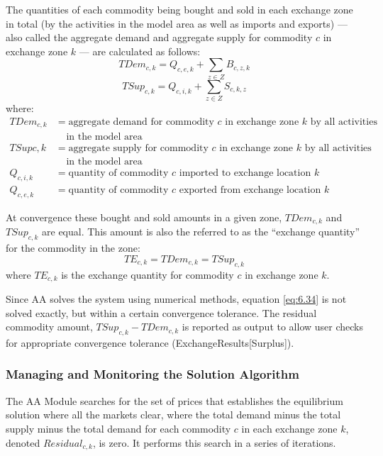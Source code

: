 The quantities of each commodity being bought and sold in each exchange zone in total (by the activities in the model area as well as imports and exports) --- also called the aggregate demand and aggregate supply for commodity $c$ in exchange zone $k$ --- are calculated as follows:
\begin{equation}\label{eq:6.32}
TDem_{c,k} = Q_{c,e,k} + \sum_{z \in Z} B_{c,z,k}
\end{equation}
\begin{equation}\label{eq:6.33}
TSup_{c,k} = Q_{c,i,k} + \sum_{z \in Z} S_{c,k,z}
\end{equation}
\noindent where:
\begin{align*}
TDem_{c,k} &= \text{aggregate demand for commodity $c$ in exchange zone $k$ by all activities} \\
 &~~~~~\text{in the model area} \\ 
TSup c,k &= \text{aggregate supply for commodity $c$ in exchange zone $k$ by all activities} \\ 
 &~~~~~\text{in the model area} \\ 
Q_{c,i,k} &= \text{quantity of commodity $c$ imported to exchange location $k$} \\
Q_{c,e,k} &= \text{quantity of commodity $c$ exported from exchange location $k$} 
\end{align*}

At convergence these bought and sold amounts in a given zone, $TDem_{c,k}$  and $TSup_{c,k}$ are equal. This amount is also the referred to as the ``exchange quantity'' for the commodity in the zone:
\begin{equation}\label{eq:6.34}
TE_{c,k} = TDem_{c,k} = TSup_{c,k}
\end{equation}
\noindent where $TE_{c,k}$ is the exchange quantity for commodity $c$ in exchange zone $k$. 

Since AA solves the system using numerical methods, equation \ref{eq:6.34} is not solved exactly, but within a certain convergence tolerance. The residual commodity amount, $TSup_{c,k} - TDem_{c,k}$ is reported as output to allow user checks for appropriate convergence tolerance (ExchangeResults[Surplus]).

\subsubsection{Managing and Monitoring the Solution Algorithm}
The AA Module searches for the set of prices that establishes the equilibrium solution where all the markets clear, where the total demand minus the total supply minus the total demand for each commodity $c$ in each exchange zone $k$, denoted $Residual_{c,k}$, is zero. It performs this search in a series of iterations.

